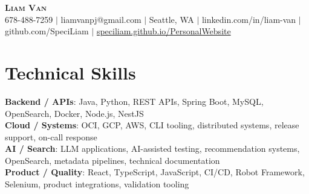 \documentclass[letterpaper,11pt]{article}
\begin{document}

%
\begin{center}
    \textbf{\Huge \scshape Liam Van} \\ \vspace{1pt}
    \small 678-488-7259 $|$ \small {liamvanpj@gmail.com} $|$ Seattle, WA
 {{$|$ linkedin.com/in/liam-van} {$|$ github.com/SpeciLiam} {$|$ \href{https://speciliam.github.io/PersonalWebsite}{speciliam.github.io/PersonalWebsite}}}

\end{center}

\section{Technical Skills}
 \begin{itemize}[leftmargin=0.15in, label={}]
    \small{\item{
     \textbf{Backend / APIs}{: Java, Python, REST APIs, Spring Boot, MySQL, OpenSearch, Docker, Node.js, NestJS} \\
     \textbf{Cloud / Systems}{: OCI, GCP, AWS, CLI tooling, distributed systems, release support, on-call response} \\
     \textbf{AI / Search}{: LLM applications, AI-assisted testing, recommendation systems, OpenSearch, metadata pipelines, technical documentation} \\
     \textbf{Product / Quality}{: React, TypeScript, JavaScript, CI/CD, Robot Framework, Selenium, product integrations, validation tooling} \\
    }}
 \end{itemize}
%
\end{document}

